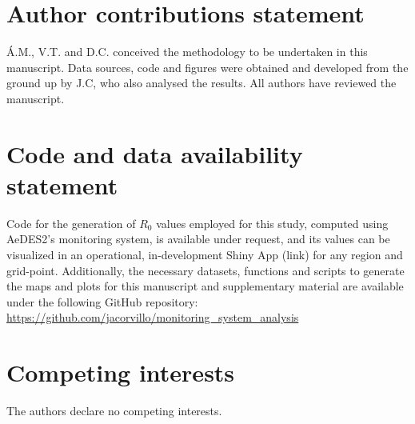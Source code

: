 \documentclass[fleqn,10pt]{wlscirep}
\begin{document}
\section*{Author contributions statement}

Á.M., V.T. and D.C. conceived the methodology to be undertaken in this manuscript. Data sources, code and figures were obtained and developed from the ground up by J.C, who also analysed the results. All authors have reviewed the manuscript. 

\section*{Code and data availability statement}
    Code for the generation of $R_0$ values employed for this study, computed using AeDES2's monitoring system, is available under request, and its values can be visualized in an operational, in-development Shiny App (link) for any region and grid-point. Additionally, the necessary datasets, functions and scripts to generate the maps and plots for this manuscript and supplementary material are available under the following GitHub repository: \url{https://github.com/jacorvillo/monitoring_system_analysis}
\section*{Competing interests}
    The authors declare no competing interests.
\end{document}
